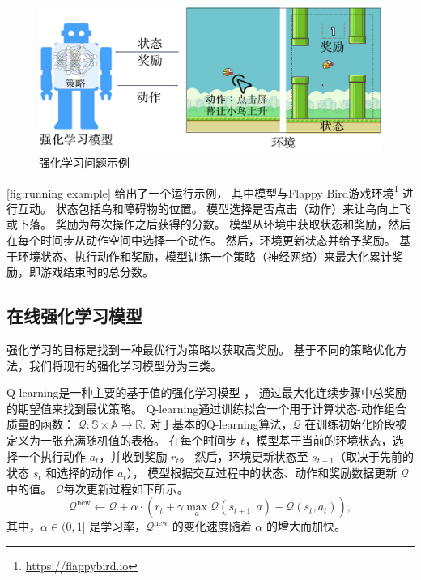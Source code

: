 \begin{figure}[!t]
    \center
    \includegraphics[width=0.6\hsize]{figure/drl_hypertheif/fig-drl-examplech.pdf}
    \caption{强化学习问题示例}
    \label{fig:running example}
\end{figure}
\autoref{fig:running example} 给出了一个运行示例，
其中模型与Flappy Bird游戏环境\footnote{\url{https://flappybird.io}} 进行互动。
状态包括鸟和障碍物的位置。
模型选择是否点击（动作）来让鸟向上飞或下落。
奖励为每次操作之后获得的分数。
模型从环境中获取状态和奖励，然后在每个时间步从动作空间中选择一个动作。
然后，环境更新状态并给予奖励。
基于环境状态、执行动作和奖励，模型训练一个策略（神经网络）来最大化累计奖励，即游戏结束时的总分数。

\subsection{在线强化学习模型}
\label{sec:Deep Reinforcement Learning model}
强化学习的目标是找到一种最优行为策略以获取高奖励。
基于不同的策略优化方法，我们将现有的强化学习模型分为三类。

Q-learning是一种主要的基于值的强化学习模型 \cite{watkins1989learning}，
通过最大化连续步骤中总奖励的期望值来找到最优策略。
Q-learning通过训练拟合一个用于计算状态-动作组合质量的函数：
$
\mathcal{Q}: \mathbb{S} \times \mathbb{A} \rightarrow \mathbb{R}.
$
对于基本的Q-learning算法，$\mathcal{Q}$ 在训练初始化阶段被定义为一张充满随机值的表格。
在每个时间步 $t$，模型基于当前的环境状态，选择一个执行动作 $a_t$，并收到奖励 $r_t$。
然后，环境更新状态至 $s_{t+1}$（取决于先前的状态 $s_t$ 和选择的动作 $a_t$），
模型根据交互过程中的状态、动作和奖励数据更新 $\mathcal{Q}$ 中的值。
$\mathcal{Q}$每次更新过程如下所示。
\begin{equation}
    \label{eq:q-learning-obj}
    \mathcal{Q}^{\text{new}} \leftarrow \mathcal{Q} + 
    \alpha \cdot\left(r_{t}+\gamma \max_{a} \mathcal{Q}\left(s_{t+1}, a\right)-\mathcal{Q}\left(s_{t}, a_{t}\right)\right), 
\end{equation}
其中，$\alpha \in (0,1]$ 是学习率，$\mathcal{Q}^{\text{new}}$ 的变化速度随着 $\alpha$ 的增大而加快。

